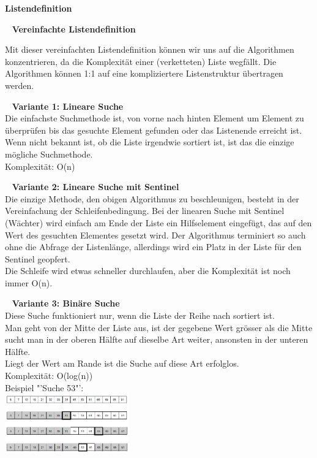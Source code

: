 \textbf{Listendefinition}

\ \newline
\textbf{Vereinfachte Listendefinition}
\begin{multicols}{2}

\vfill\null
\columnbreak
Mit dieser vereinfachten Listendefinition können wir uns auf die Algorithmen konzentrieren, da die Komplexität einer (verketteten) Liste wegfällt. Die Algorithmen können 1:1 auf eine kompliziertere Listenstruktur übertragen werden.
\end{multicols}
\ \newline
\textbf{Variante 1: Lineare Suche}\\
Die einfachste Suchmethode ist, von vorne nach hinten Element um Element zu überprüfen bis das gesuchte Element gefunden oder das Listenende erreicht ist. Wenn nicht bekannt ist, ob die Liste irgendwie sortiert ist, ist das die einzige mögliche Suchmethode. \\
Komplexität: O(n)

\ \newline
\textbf{Variante 2: Lineare Suche mit Sentinel}\\
Die einzige Methode, den obigen Algorithmus zu beschleunigen, besteht in der Vereinfachung der
Schleifenbedingung. Bei der linearen Suche mit Sentinel (Wächter) wird einfach am Ende der Liste ein Hilfselement eingefügt, das auf den Wert des gesuchten Elementes gesetzt wird. Der Algorithmus terminiert so auch ohne die Abfrage der Listenlänge, allerdings wird ein Platz in der Liste für den Sentinel geopfert.\\
Die Schleife wird etwas schneller durchlaufen, aber die Komplexität ist noch immer O(n).

\ \newline
\textbf{Variante 3: Binäre Suche}\\
Diese Suche funktioniert nur, wenn die Liste der Reihe nach sortiert ist.\\
Man geht von der Mitte der Liste aus, ist der gegebene Wert grösser als die Mitte sucht man in der oberen Hälfte auf dieselbe Art weiter, ansonsten in der unteren Hälfte.\\
Liegt der Wert am Rande ist die Suche auf diese Art erfolglos.\\
Komplexität: O(log(n))\\

Beispiel "'Suche 53"':\\
\includegraphics[width=0.4\textwidth]{images/Algorithmen/BinaereSuche.png}

